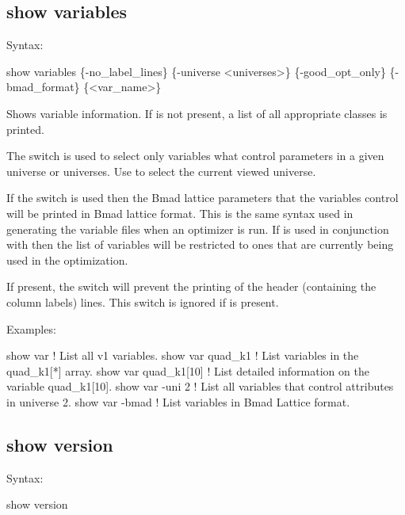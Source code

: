 {{{{{{{{{{{%

\subsection{show variables}
\label{s:show.variables}

Syntax:
\begin{example}
  show variables \{-no_label_lines\} \{-universe <universes>\}            
         \{-good_opt_only\} \{-bmad_format\} \{<var_name>\}
\end{example}


Shows variable information. If  is not present, a list of all appropriate 
classes is printed.

The  switch is used to select only variables what control parameters in a given
universe or universes. Use  to select the current viewed universe.

If the  switch is used then the Bmad lattice parameters that the \tao variables
control will be printed in Bmad lattice format. This is the same syntax used in generating the
variable files when an optimizer is run. If  is used in conjunction with
 then the list of variables will be restricted to ones that are currently being
used in the optimization.

If present, the  switch will prevent the printing of the header (containing the
column labels) lines. This switch is ignored if  is present.

Examples:
\begin{example}
  show var             ! List all v1 variables.
  show var quad_k1     ! List variables in the quad_k1[*] array.
  show var quad_k1[10] ! List detailed information on the variable quad_k1[10].
  show var -uni 2      ! List all variables that control attributes in universe 2.
  show var -bmad       ! List variables in Bmad Lattice format.
\end{example}


\subsection{show version}
\label{s:show.version}

Syntax:
\begin{example}
  show version 
\end{example}

}}}}}}}}}}}
